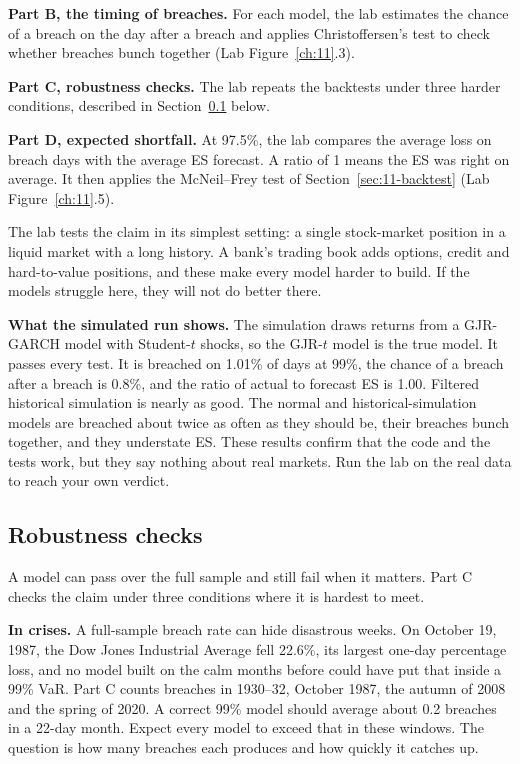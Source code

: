 \textbf{Part B, the timing of breaches.} For each model, the lab estimates the chance of a breach on the day after a breach and applies Christoffersen's test to check whether breaches bunch together (Lab Figure~\ref{ch:11}.3).

\textbf{Part C, robustness checks.} The lab repeats the backtests under three harder conditions, described in Section~\ref{sec:11-stress} below.

\textbf{Part D, expected shortfall.} At 97.5\%, the lab compares the average loss on breach days with the average ES forecast. A ratio of 1 means the ES was right on average. It then applies the McNeil--Frey test of Section~\ref{sec:11-backtest} (Lab Figure~\ref{ch:11}.5).

The lab tests the claim in its simplest setting: a single stock-market position in a liquid market with a long history. A bank's trading book adds options, credit and hard-to-value positions, and these make every model harder to build. If the models struggle here, they will not do better there.

\textbf{What the simulated run shows.} The simulation draws returns from a GJR-GARCH model with Student-$t$ shocks, so the GJR-$t$ model is the true model. It passes every test. It is breached on 1.01\% of days at 99\%, the chance of a breach after a breach is 0.8\%, and the ratio of actual to forecast ES is 1.00. Filtered historical simulation is nearly as good. The normal and historical-simulation models are breached about twice as often as they should be, their breaches bunch together, and they understate ES. These results confirm that the code and the tests work, but they say nothing about real markets. Run the lab on the real data to reach your own verdict.

\subsection{Robustness checks}
\label{sec:11-stress}

A model can pass over the full sample and still fail when it matters. Part C checks the claim under three conditions where it is hardest to meet.

\textbf{In crises.} A full-sample breach rate can hide disastrous weeks. On October 19, 1987, the Dow Jones Industrial Average fell 22.6\%, its largest one-day percentage loss, and no model built on the calm months before could have put that inside a 99\% VaR. Part C counts breaches in 1930--32, October 1987, the autumn of 2008 and the spring of 2020. A correct 99\% model should average about 0.2 breaches in a 22-day month. Expect every model to exceed that in these windows. The question is how many breaches each produces and how quickly it catches up.

